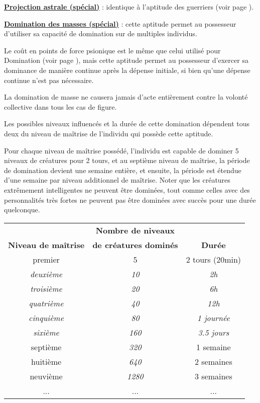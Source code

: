 \bigskip

\textbf{\uline{Projection astrale (spécial)}} : identique à l'aptitude des guerriers (voir page \pageref{magicien-projection-astrale}).

\bigskip

\textbf{\uline{Domination des masses (spécial)}} : cette aptitude permet au possesseur d'utiliser sa capacité de domination sur de multiples individus.

\bigskip

Le coût en points de force psionique est le même que celui utilisé pour Domination (voir page \pageref{guerrier-domination}), mais cette aptitude permet au possesseur d'exercer sa dominance de manière continue après la dépense initiale, si bien qu'une dépense continue n'est pas nécessaire.

\bigskip

La domination de masse ne causera jamais d'acte entièrement contre la volonté collective dans tous les cas de figure.

\bigskip

Les possibles niveaux influencés et la durée de cette domination dépendent tous deux du niveau de maîtrise de l'individu qui possède cette aptitude.

Pour chaque niveau de maîtrise possédé, l'individu est capable de dominer 5 niveaux de créatures pour 2 tours, et au septième niveau de maîtrise, la période de domination devient une semaine entière, et ensuite, la période est étendue d'une semaine par niveau additionnel de maîtrise. Noter que les créatures extrêmement intelligentes ne peuvent être dominées, tout comme celles avec des personnalités très fortes ne peuvent pas être dominées avec succès pour une durée quelconque.

\bigskip

\begin{tabular}{ccc}
                                 &\textbf{Nombre de niveaux} &\\
\textbf{Niveau de maîtrise}      & \textbf{de créatures dominés} & \textbf{Durée} \\
premier             & 5     & 2 tours (20min)      \\
\textit{deuxième}            & \textit{10}    & \textit{2h}                    \\
\textit{troisième}           & \textit{20}    & \textit{6h}                    \\
\textit{quatrième}           & \textit{40}    & \textit{12h}                   \\
\textit{cinquième}           & \textit{80}    & \textit{1 journée}                \\
\textit{sixième}             & \textit{160}   & \textit{3.5 jours} \\
septième   & \textit{320}   & 1 semaine \\
huitième            & \textit{640}   & 2 semaines \\
neuvième            & \textit{1280}  & 3 semaines \\
... & ... & ...
\end{tabular}


